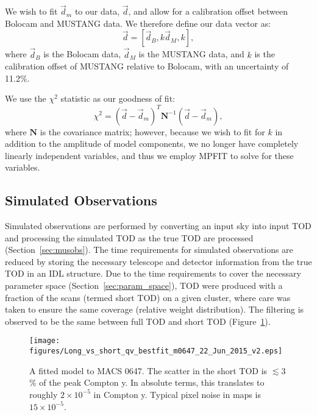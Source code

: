 \documentclass[iop,numberedappendix,apj]{emulateapj}
\begin{document}
We wish to fit $\vec{d}_m$ to our data, $\vec{d}$, and allow for a calibration offset between Bolocam and
MUSTANG data. We therefore define our data vector as:
\begin{equation}
  \vec{d} = [ \vec{d}_{B}, k \vec{d}_{M}, k ] ,
\end{equation}
where $\vec{d}_{B}$ is the Bolocam data, $\vec{d}_{M}$ is the MUSTANG data, and $k$ is the calibration offset of
MUSTANG relative to Bolocam, with an uncertainty of 11.2\%.

We use the $\chi^2$ statistic as our goodness of fit:
\begin{equation}
  \chi^2 = (\overrightarrow{d} - \overrightarrow{d}_m)^T \mathbf{N}^{-1} (\overrightarrow{d} - \overrightarrow{d}_m),
\end{equation}
where $\mathbf{N}$ is the covariance matrix; however, because we wish to fit for $k$ in addition to the 
amplitude of model components, we no longer have
completely linearly independent variables, and thus we employ MPFIT \citep{markwardt2009} to solve for these
variables.

\subsection{Simulated Observations}
\label{sec:jf_filtering}

Simulated observations are performed by converting an input sky into input TOD and processing the simulated TOD
as the true TOD are processed (Section~\ref{sec:musobs}). The time requirements for simulated observations are  
reduced by storing the necessary telescope and detector information from the true TOD in an IDL structure. 
Due to the time requirements to cover the
necessary parameter space (Section~\ref{sec:param_space}), TOD were produced with a fraction of the scans (termed
short TOD) on a given cluster, where care was taken to ensure the same coverage (relative weight distribution). 
The filtering is observed to be the same between full TOD and short TOD (Figure~\ref{fig:long_vs_short_qv}). 

\begin{figure}[!h]
  \centering
  \texttt{[image: figures/Long\_vs\_short\_qv\_bestfit\_m0647\_22\_Jun\_2015\_v2.eps]}
  \caption{A fitted model to MACS 0647. The scatter in the short TOD is $\lesssim 3$\% 
    of the peak Compton y. In absolute terms, this translates to roughly $2\times 10^{-5}$ in Compton y. 
    Typical pixel noise in maps is $15 \times 10^{-5}$.}
  \label{fig:long_vs_short_qv}
\end{figure}
\end{document}
